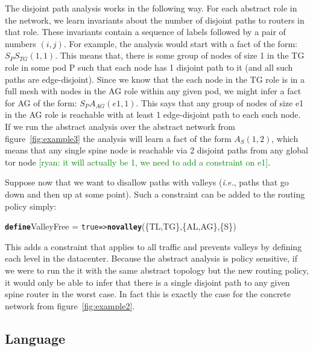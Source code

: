 \documentclass{sig-alternate-10pt}
\newcommand{\ryan}[1]{\textcolor{green}{[ryan: #1]}}
\newcommand{\IE}{\emph{i.e.}}
\newcommand{\CD}[1]{\texttt{\small #1}}  %
\newcommand{\KW}[1]{\texttt{\small\bfseries{#1}}}
\newcommand{\True}{\CD{true}}
\newcommand{\Define}{\KW{define}}
\newcommand{\Path}{\texttt{=>}}
\newcommand{\Novalley}{\KW{novalley}}
\begin{document}
The disjoint path analysis works in the following way. For each abstract role in the network, we learn invariants about the number of disjoint paths to routers in that role. These invariants contain a sequence of labels followed by a pair of numbers $(i,j)$. For example, the analysis would start with a fact of the form: $S_P S_{TG} (1,1)$. This means that, there is some group of nodes of size 1 in the TG role in some pod P such that each node has 1 disjoint path to it (and all such paths are edge-disjoint). Since we know that the each node in the TG role is in a full mesh with nodes in the AG role within any given pod, we might infer a fact for AG of the form: $S_P A_{AG}(e1,1)$. This says that any group of nodes of size e1 in the AG role is reachable with at least 1 edge-disjoint path to each such node.
%
If we run the abstract analysis over the abstract network from figure~\ref{fig:example3} the analysis will learn a fact of the form $A_{S}(1,2)$, which means that any single spine node is reachable via 2 disjoint paths from any global tor node \ryan{it will actually be 1, we need to add a constraint on e1}. 

Suppose now that we want to disallow paths with valleys (\IE, paths that go down and then up at some point). Such a constraint can be added to the routing policy simply:
\begin{code}
\Define ValleyFree =
    \True \Path \Novalley(\{TL,TG\},\{AL,AG\},\{S\})
\end{code}
\noindent%

This adds a constraint that applies to all traffic and prevents valleys by defining each level in the datacenter.
Because the abstract analysis is policy sensitive, if we were to run the it with the same abstract topology but the new routing policy, it would only be able to infer that there is a single disjoint path to any given spine router in the worst case. In fact this is exactly the case for the concrete network from figure~\ref{fig:example2}.  

%
%
%

\subsection{Language}


%
%
%
%
\end{document}
